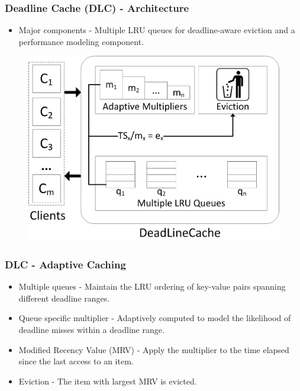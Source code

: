 \documentclass{beamer}
\begin{document}
\begin{frame}
  \frametitle{Deadline Cache (DLC) - Architecture}
  \begin{itemize}
  \item Major components - Multiple LRU queues for deadline-aware eviction and
    a performance modeling component.
  \end{itemize}
  \begin{figure}
    \begin{center}
      \centerline{\includegraphics[scale=0.8]{img/DLC.png}}
    \end{center}
  \end{figure}
\end{frame}


\begin{frame}
  \frametitle{DLC - Adaptive Caching}
  \begin{itemize}
  \item Multiple queues - Maintain the LRU ordering of key-value pairs spanning
    different deadline ranges.
  \item Queue specific multiplier - Adaptively computed to model the likelihood
    of deadline misses within a deadline range.
  \item Modified Recency Value (MRV) - Apply the multiplier to the time elapsed
    since the last access to an item.
  \item Eviction - The item with largest MRV is evicted.
  \end{itemize}
\end{frame}
\end{document}
